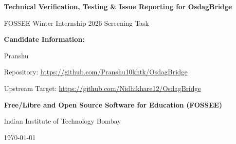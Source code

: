 \documentclass[11pt,a4paper]{report}
\begin{document}
\begin{titlepage}
    \centering
    \vspace*{1.5cm}
    
    {\Huge \bfseries Technical Verification, Testing \& Issue Reporting for OsdagBridge \par}
    \vspace{0.8cm}
    {\LARGE FOSSEE Winter Internship 2026 Screening Task \par}
    \vspace{1.5cm}
    
    \textbf{\Large Candidate Information:}\\[0.3cm]
    {\large Pranshu \par}
    {\large Repository: \url{https://github.com/Pranshu10khtk/OsdagBridge} \par}
    {\large Upstream Target: \url{https://github.com/Nidhikhare12/OsdagBridge} \par}
    
    \vspace{2.5cm}
    
    \textbf{\Large Free/Libre and Open Source Software for Education (FOSSEE)}\\[0.2cm]
    {\large Indian Institute of Technology Bombay \par}
    \vfill
    {\large \today \par}
\end{titlepage}


\begin{abstract}
This report documents the comprehensive software quality assurance, verification and validation (V\&V), numerical stability audit, and defect investigation conducted on \textbf{OsdagBridge} as part of the FOSSEE Winter Internship 2026 screening task. OsdagBridge is an open-source bridge engineering software system developed for the analysis, design, and 3D modeling of steel and composite bridges under Indian Standard codes (IRC:5, IRC:6, IRC:22, IRC:24, and IS 800). 

Testing covers input boundary verification, custom material parameter propagation, multi-run state isolation, internal dictionary data contracts, 3D OpenCASCADE CAD generation, and 2D Matplotlib response envelopes. A modular automated verification framework has been constructed within the dedicated \texttt{fossee\_testing} workspace. Defect reports identify root causes at the source-code level and supply actionable fixes, advancing software reliability for structural engineering practitioners.
\end{abstract}
\end{document}
